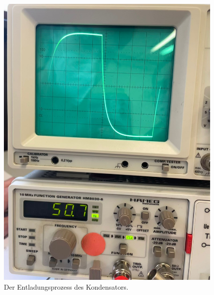 \begin{figure}
  \centering
  \label{abb:Entladung}
  \includegraphics[scale=0.1]{content/entladung.png}
  \caption{Der Entladungsprozess des Kondensators.}
\end{figure}

